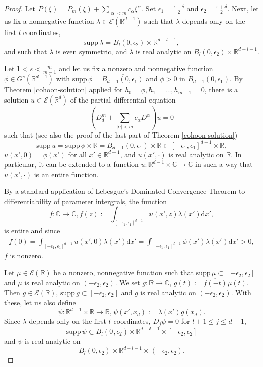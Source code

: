 \documentclass[a4paper,10pt]{amsart}
\newtheorem*{crucial lemma}{Lemma \ref{lem:nice polynomial2}}
\theoremstyle{definition}
\newcommand{\R}{\mathbb{R}}
\newcommand{\C}{\mathbb{C}}
\newcommand{\supp}{\mbox{supp}\,}
\begin{document}
\begin{proof}
Let $P(\xi)=P_m(\xi)+\sum_{|\alpha|<m}c_\alpha\xi^\alpha$. Set $\epsilon_1=\frac{\epsilon-\delta}{2}$ and $\epsilon_2=\frac{\epsilon+\delta}{2}$. Next, let us fix a nonnegative function $\lambda\in \mathscr{E}(\R^{d-1})$ such that $\lambda$ depends only on the first $l$ coordinates,
\[\supp\lambda=\overline{B_l(0,\epsilon_2)}\times\R^{d-l-1},\] and such that $\lambda$ is even symmetric, and $\lambda$ is real analytic on $B_l(0,\epsilon_2)\times\R^{d-l-1}$. 
	
	Let $1<s<\frac{m}{m-1}$ and let us fix a nonzero and nonnegative function $\phi\in G^s(\R^{d-1})$ with $\supp\phi=\overline{B_{d-1}(0,\epsilon_1)}$ and $\phi>0$ in $B_{d-1}(0,\epsilon_1)$.
	By Theorem \ref{cohoon-solution} applied for $h_0=\phi, h_1=\ldots,h_{m-1}=0$, there is a solution $u\in \mathscr{E}(\R^d)$ of the partial differential equation
	\[\left(D_d^m+\sum_{|\alpha|<m} c_\alpha D^\alpha\right)u=0\]
	such that (see also the proof of the last part of Theorem \ref{cohoon-solution})
	$$\supp{u}=\supp\phi\times\R=\overline{B_{d-1}(0,\epsilon_1)}\times\R\subset[-\epsilon_1,\epsilon_1]^{d-1}\times\R,$$
	$u(x',0)=\phi(x')$ for all $x'\in\R^{d-1}$, and $u(x',\cdot)$ is real analytic on $\R$. In particular, it can be extended to a function $u\colon\R^{d-1}\times\C\to\C$ in such a way that $u(x',\cdot)$ is an entire function.
	
	By a standard application of Lebesgue's Dominated Convergence Theorem to differentiability of parameter intergrals, the function
	\[f\colon\C\to\C, f(z):=\int_{\left[-\epsilon_1,\epsilon_1\right]^{d-1}}u(x',z)\lambda(x')\mathrm{d}x',\]
	is entire and since
	\begin{align*}
		f(0)=\int_{\left[-\epsilon_1,\epsilon_1\right]^{d-1}}u(x',0)\lambda(x')\mathrm{d}x'=\int_{\left[-\epsilon_1,\epsilon_1\right]^{d-1}}\phi(x')\lambda(x')\mathrm{d}x'>0,
	\end{align*}
	$f$ is nonzero. 
	
	Let $\mu\in \mathscr{E}(\R)$ be a nonzero, nonnegative function such that $\supp\mu\subset\left[-\epsilon_2,\epsilon_2\right]$ and $\mu$ is real analytic on $\left(-\epsilon_2,\epsilon_2\right)$. We set $g\colon\R\to\C$, $g(t):=\overline{f(-t)}\mu(t)$. Then $g\in \mathscr{E}(\R)$, $\supp g\subset\left[-\epsilon_2,\epsilon_2\right]$ and $g$ is real analytic on $\left(-\epsilon_2,\epsilon_2\right)$. With these, let us also define
	\[\psi\colon\R^{d-1}\times\R\to\R, \psi(x',x_d):=\lambda(x')g(x_d).\]
	Since $\lambda$ depends only on the first $l$ coordinates, $D_j\psi=0$ for $l+1\leq j\leq d-1$,
	\[\supp{\psi}\subset\overline{B_{l}(0,\epsilon_2)}\times\R^{d-l-1}\times\left[-\epsilon_2,\epsilon_2\right]\] and $\psi$ is real analytic on
    \[B_{l}(0,\epsilon_2)\times\R^{d-l-1}\times\left(-\epsilon_2,\epsilon_2\right).\]
	

\end{proof}
\end{document}
